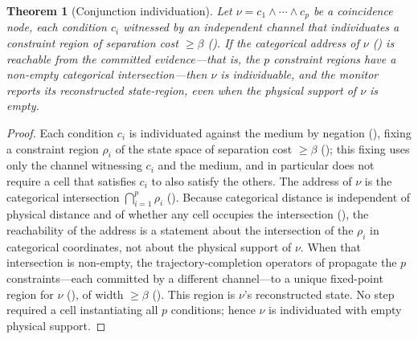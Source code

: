 \documentclass[11pt,twocolumn,a4paper]{article}
\theoremstyle{thmstyle}
\newtheorem{theorem}{Theorem}[section]
\theoremstyle{definition}
\theoremstyle{remark}
\newcommand{\floorc}{\beta}
\newcommand{\Reac}{\rho}
\begin{document}
\begin{theorem}[Conjunction individuation]
\label{thm:conjunction}
Let $\nu=c_1\wedge\cdots\wedge c_p$ be a coincidence node, each condition
$c_i$ witnessed by an independent channel that individuates a constraint
region of separation cost $\ge\floorc$ (). If the
categorical address of $\nu$ () is reachable
from the committed evidence---that is, the $p$ constraint regions have a
non-empty categorical intersection---then $\nu$ is individuable, and the
monitor reports its reconstructed state-region, \emph{even when the physical
support of $\nu$ is empty}.
\end{theorem}

\begin{proof}
Each condition $c_i$ is individuated against the medium by negation
(), fixing a constraint region $\Reac_i$ of the state
space of separation cost $\ge\floorc$ (); this fixing uses
only the channel witnessing $c_i$ and the medium, and in particular does not
require a cell that satisfies $c_i$ to also satisfy the others. The address
of $\nu$ is the categorical intersection $\bigcap_{i=1}^{p}\Reac_i$
(). Because categorical distance is
independent of physical distance and of whether any cell occupies the
intersection (), the reachability of the address is a
statement about the intersection of the $\Reac_i$ in categorical
coordinates, not about the physical support of $\nu$. When that intersection
is non-empty, the trajectory-completion operators of 
propagate the $p$ constraints---each committed by a different channel---to a
unique fixed-point region for $\nu$ (), of width
$\ge\floorc$ (). This region is $\nu$'s
reconstructed state. No step required a cell instantiating all $p$
conditions; hence $\nu$ is individuated with empty physical support.
\end{proof}
\end{document}

